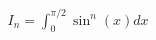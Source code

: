 \documentclass[preview]{standalone}
\begin{document}
\begin{align*}
I_n = \int_0^{\pi/2} \sin^n(x) dx
\end{align*}
\end{document}
